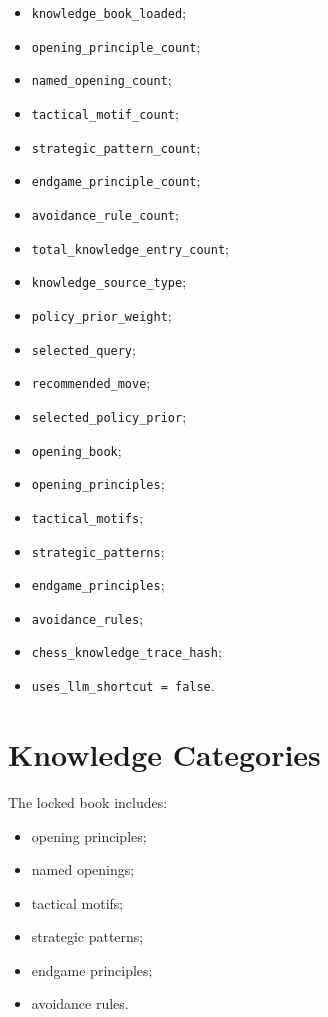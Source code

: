 \documentclass[11pt,a4paper]{article}
\begin{document}
\begin{itemize}
  \item \texttt{knowledge\_book\_loaded};
  \item \texttt{opening\_principle\_count};
  \item \texttt{named\_opening\_count};
  \item \texttt{tactical\_motif\_count};
  \item \texttt{strategic\_pattern\_count};
  \item \texttt{endgame\_principle\_count};
  \item \texttt{avoidance\_rule\_count};
  \item \texttt{total\_knowledge\_entry\_count};
  \item \texttt{knowledge\_source\_type};
  \item \texttt{policy\_prior\_weight};
  \item \texttt{selected\_query};
  \item \texttt{recommended\_move};
  \item \texttt{selected\_policy\_prior};
  \item \texttt{opening\_book};
  \item \texttt{opening\_principles};
  \item \texttt{tactical\_motifs};
  \item \texttt{strategic\_patterns};
  \item \texttt{endgame\_principles};
  \item \texttt{avoidance\_rules};
  \item \texttt{chess\_knowledge\_trace\_hash};
  \item \texttt{uses\_llm\_shortcut = false}.
\end{itemize}

\section{Knowledge Categories}

The locked book includes:

\begin{itemize}
  \item opening principles;
  \item named openings;
  \item tactical motifs;
  \item strategic patterns;
  \item endgame principles;
  \item avoidance rules.
\end{itemize}
\end{document}
